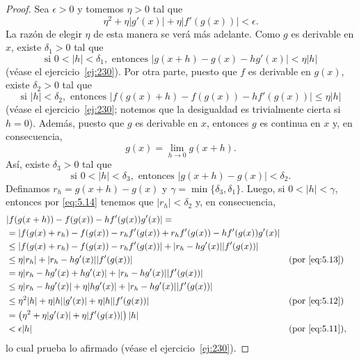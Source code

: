 \documentclass[12pt,a4paper]{book}
\begin{document}
\begin{proof}
        Sea $\epsilon>0$ y tomemos $\eta>0$ tal que
        \begin{equation}\label{eq:5.11}
            \eta^{2}+\eta|g'(x)|+\eta|f'(g(x))|<\epsilon.
        \end{equation}
        La razón de elegir $\eta$ de esta manera se verá más adelante. Como $g$ es derivable
        en $x$, existe $\delta_{1}>0$ tal que
        \begin{equation}\label{eq:5.12}
            \text{si }0<|h|<\delta_{1},\text{ entonces }|g(x+h)-g(x)-hg'(x)|<\eta|h|
        \end{equation}
        (véase el ejercicio~\ref{ej:230}). Por otra parte, puesto que $f$ es derivable en $g(x)$,
        existe $\delta_{2}>0$ tal que
        \begin{equation}\label{eq:5.13}
            \text{si }|h|<\delta_{2},\text{ entonces }|f(g(x)+h)-f(g(x))-hf'(g(x))|\leq\eta|h|
        \end{equation}
        (véase el ejercicio~\ref{ej:230}; notemos que la desigualdad es trivialmente cierta si $h=0$). Además, puesto que $g$ es derivable en $x$, entonces $g$
        es continua en $x$ y, en consecuencia,
        \begin{equation*}
            g(x)=\lim_{h\to 0}g(x+h).
        \end{equation*}
        Así, existe $\delta_{3}>0$ tal que
        \begin{equation}\label{eq:5.14}
            \text{si }0<|h|<\delta_{3},\text{ entonces }|g(x+h)-g(x)|<\delta_{2}.
        \end{equation}
        Definamos $r_{h}=g(x+h)-g(x)$ y $\gamma=\min\{\delta_{3},\delta_{1}\}$. Luego, si $0<|h|<\gamma$,
        entonces por \eqref{eq:5.14} tenemos que $|r_{h}|<\delta_{2}$ y, en consecuencia,
        \begin{align*}
            &|f(g(x+h))-f(g(x))-hf'(g(x))g'(x)|=\\
            &=|f(g(x)+r_{h})-f(g(x))-r_{h}f'(g(x))+r_{h}f'(g(x))-hf'(g(x))g'(x)|\\
            &\leq|f(g(x)+r_{h})-f(g(x))-r_{h}f'(g(x))|+|r_{h}-hg'(x)||f'(g(x))|\\
            &\leq\eta|r_{h}|+|r_{h}-hg'(x)||f'(g(x))| &&\text{(por \eqref{eq:5.13})}\\
            &=\eta|r_{h}-hg'(x)+hg'(x)|+|r_{h}-hg'(x)||f'(g(x))|\\
            &\leq\eta|r_{h}-hg'(x)|+\eta|hg'(x)|+|r_{h}-hg'(x)||f'(g(x))|\\
            &\leq\eta^{2}|h|+\eta|h||g'(x)|+\eta|h||f'(g(x))| &&\text{(por \eqref{eq:5.12})}\\
            &=\left(\eta^{2}+\eta|g'(x)|+\eta|f'(g(x))|\right)|h|\\
            &<\epsilon|h| &&\text{(por \eqref{eq:5.11})},
        \end{align*}
        lo cual prueba lo afirmado (véase el ejercicio~\ref{ej:230}).
    \end{proof}
\end{document}
